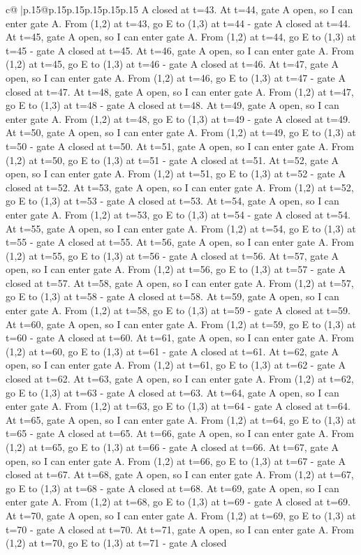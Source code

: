\documentclass{article}
\begin{document}
{\begin{supertabular}{c@{$\;$}|p{.15\linewidth}@{}p{.15\linewidth}p{.15\linewidth}p{.15\linewidth}p{.15\linewidth}p{.15\linewidth}}
{{{A closed at t=43. At t=44, gate A open, so I can enter gate A. From (1,2) at t=43, go E to (1,3) at t=44 {-} gate A closed at t=44. At t=45, gate A open, so I can enter gate A. From (1,2) at t=44, go E to (1,3) at t=45 {-} gate A closed at t=45. At t=46, gate A open, so I can enter gate A. From (1,2) at t=45, go E to (1,3) at t=46 {-} gate A closed at t=46. At t=47, gate A open, so I can enter gate A. From (1,2) at t=46, go E to (1,3) at t=47 {-} gate A closed at t=47. At t=48, gate A open, so I can enter gate A. From (1,2) at t=47, go E to (1,3) at t=48 {-} gate A closed at t=48. At t=49, gate A open, so I can enter gate A. From (1,2) at t=48, go E to (1,3) at t=49 {-} gate A closed at t=49. At t=50, gate A open, so I can enter gate A. From (1,2) at t=49, go E to (1,3) at t=50 {-} gate A closed at t=50. At t=51, gate A open, so I can enter gate A. From (1,2) at t=50, go E to (1,3) at t=51 {-} gate A closed at t=51. At t=52, gate A open, so I can enter gate A. From (1,2) at t=51, go E to (1,3) at t=52 {-} gate A closed at t=52. At t=53, gate A open, so I can enter gate A. From (1,2) at t=52, go E to (1,3) at t=53 {-} gate A closed at t=53. At t=54, gate A open, so I can enter gate A. From (1,2) at t=53, go E to (1,3) at t=54 {-} gate A closed at t=54. At t=55, gate A open, so I can enter gate A. From (1,2) at t=54, go E to (1,3) at t=55 {-} gate A closed at t=55. At t=56, gate A open, so I can enter gate A. From (1,2) at t=55, go E to (1,3) at t=56 {-} gate A closed at t=56. At t=57, gate A open, so I can enter gate A. From (1,2) at t=56, go E to (1,3) at t=57 {-} gate A closed at t=57. At t=58, gate A open, so I can enter gate A. From (1,2) at t=57, go E to (1,3) at t=58 {-} gate A closed at t=58. At t=59, gate A open, so I can enter gate A. From (1,2) at t=58, go E to (1,3) at t=59 {-} gate A closed at t=59. At t=60, gate A open, so I can enter gate A. From (1,2) at t=59, go E to (1,3) at t=60 {-} gate A closed at t=60. At t=61, gate A open, so I can enter gate A. From (1,2) at t=60, go E to (1,3) at t=61 {-} gate A closed at t=61. At t=62, gate A open, so I can enter gate A. From (1,2) at t=61, go E to (1,3) at t=62 {-} gate A closed at t=62. At t=63, gate A open, so I can enter gate A. From (1,2) at t=62, go E to (1,3) at t=63 {-} gate A closed at t=63. At t=64, gate A open, so I can enter gate A. From (1,2) at t=63, go E to (1,3) at t=64 {-} gate A closed at t=64. At t=65, gate A open, so I can enter gate A. From (1,2) at t=64, go E to (1,3) at t=65 {-} gate A closed at t=65. At t=66, gate A open, so I can enter gate A. From (1,2) at t=65, go E to (1,3) at t=66 {-} gate A closed at t=66. At t=67, gate A open, so I can enter gate A. From (1,2) at t=66, go E to (1,3) at t=67 {-} gate A closed at t=67. At t=68, gate A open, so I can enter gate A. From (1,2) at t=67, go E to (1,3) at t=68 {-} gate A closed at t=68. At t=69, gate A open, so I can enter gate A. From (1,2) at t=68, go E to (1,3) at t=69 {-} gate A closed at t=69. At t=70, gate A open, so I can enter gate A. From (1,2) at t=69, go E to (1,3) at t=70 {-} gate A closed at t=70. At t=71, gate A open, so I can enter gate A. From (1,2) at t=70, go E to (1,3) at t=71 {-} gate A closed }}}
\end{supertabular}}
\end{document}

